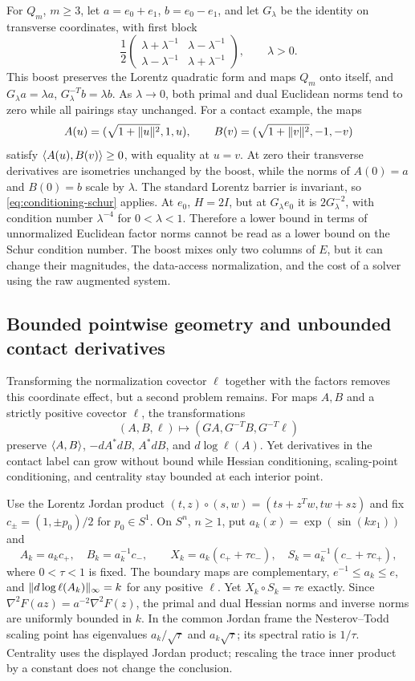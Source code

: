 For $Q_m$, $m\geq3$, let $a=e_0+e_1$, $b=e_0-e_1$, and let $G_\lambda$
be the identity on transverse coordinates, with first block
\[
 \frac12\begin{pmatrix}
 \lambda+\lambda^{-1}&\lambda-\lambda^{-1}\\
 \lambda-\lambda^{-1}&\lambda+\lambda^{-1}
 \end{pmatrix},\qquad \lambda>0.
\]
This boost preserves the Lorentz quadratic form and maps $Q_m$ onto itself, and $G_\lambda a=\lambda a$,
$G_\lambda^{-T}b=\lambda b$.  As $\lambda\to0$, both primal and dual
Euclidean norms tend to zero while all pairings stay unchanged.  For a
contact example, the maps
\[
 A(u)=(\sqrt{1+\lVert u\rVert^2},1,u),\qquad
 B(v)=(\sqrt{1+\lVert v\rVert^2},-1,-v)
\]
satisfy $\langle A(u),B(v)\rangle\geq0$, with equality at $u=v$.
At zero their transverse derivatives are isometries unchanged by the
boost, while the norms of $A(0)=a$ and $B(0)=b$ scale by $\lambda$.
The standard Lorentz barrier is invariant, so
\eqref{eq:conditioning-schur} applies.  At $e_0$, $H=2I$, but at
$G_\lambda e_0$ it is $2G_\lambda^{-2}$, with condition number
$\lambda^{-4}$ for $0<\lambda<1$.
Therefore a lower bound in terms of unnormalized Euclidean factor norms
cannot be read as a lower bound on the Schur condition number.  The
boost mixes only two columns of $E$, but it can change their magnitudes,
the data-access normalization, and the cost of a solver using the raw
augmented system.

\subsection{Bounded pointwise geometry and unbounded contact derivatives}

Transforming the normalization covector $\ell$ together with the
factors removes this coordinate effect, but a second problem remains.
For maps $A,B$ and a strictly positive covector $\ell$, the
transformations
\[
 (A,B,\ell)\mapsto(GA,G^{-T}B,G^{-T}\ell)
\]
preserve $\langle A,B\rangle$, $-dA^*dB$, $A^*dB$, and $d\log\ell(A)$.
Yet derivatives in the contact label can grow without bound while Hessian conditioning, scaling-point conditioning,
and centrality stay bounded at each interior point.

Use the Lorentz Jordan product
$(t,z)\circ(s,w)=(ts+z^Tw,tw+sz)$ and fix
$c_\pm=(1,\pm p_0)/2$ for $p_0\in S^1$.
On $S^n$, $n\geq1$, put $a_k(x)=\exp(\sin(kx_1))$ and
\begin{equation}\label{eq:conditioning-radial}
 A_k=a_kc_+,\quad B_k=a_k^{-1}c_-,\qquad
 X_k=a_k(c_++\tau c_-),\quad
 S_k=a_k^{-1}(c_-+\tau c_+),
\end{equation}
where $0<\tau<1$ is fixed.  The boundary maps are complementary,
$e^{-1}\leq a_k\leq e$, and
$\lVert d\log\ell(A_k)\rVert_\infty=k$ for any positive $\ell$.
Yet $X_k\circ S_k=\tau e$ exactly.  Since
$\nabla^2F(az)=a^{-2}\nabla^2F(z)$, the primal and dual Hessian norms
and inverse norms are uniformly bounded in $k$.  In the common Jordan
frame the Nesterov--Todd scaling point has eigenvalues
$a_k/\sqrt\tau$ and $a_k\sqrt\tau$; its spectral ratio is $1/\tau$.
Centrality uses the displayed Jordan product; rescaling the trace
inner product by a constant does not change the conclusion.

